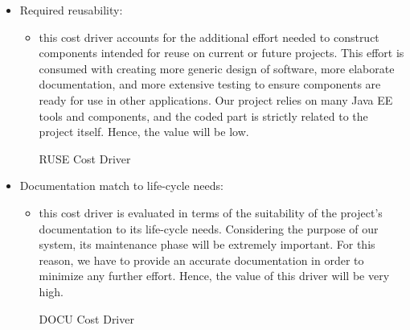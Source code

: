 \begin{itemize}
	\item Required reusability: 
	\begin{itemize}
	\item[] this cost driver accounts for the additional effort needed to construct components intended for reuse on current or future projects. This effort is consumed with creating more generic design of software, more elaborate documentation, and more extensive testing to ensure components are ready for use in other applications. Our project relies on many Java EE tools and components, and the coded part is strictly related to the project itself. Hence, the value will be low.
	\begin{costdriverstable}{RUSE Cost Driver}
		\hline
	\end{costdriverstable}
	\end{itemize}
\end{itemize}

\begin{itemize}
	\item Documentation match to life-cycle needs: 
	\begin{itemize}
	\item[] this cost driver is evaluated in terms of the suitability of the project’s documentation to its life-cycle needs. Considering the purpose of our system, its maintenance phase will be extremely important. For this reason, we have to provide an accurate documentation in order to minimize any further effort. Hence, the value of this driver will be very high.
	\begin{costdriverstable}{DOCU Cost Driver}
		\hline
	\end{costdriverstable}
	\end{itemize}
\end{itemize}

